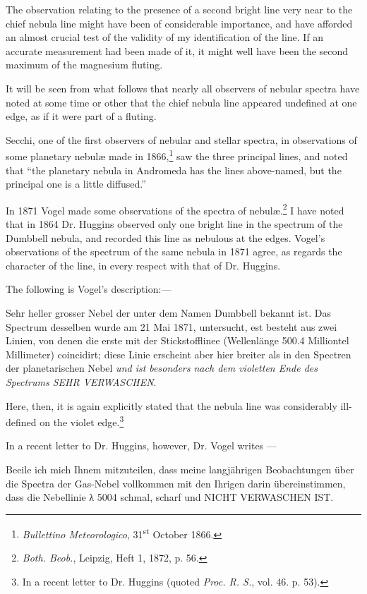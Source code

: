 \documentclass[a4paper, 12pt, oneside, polutonikogreek, english]{article}
\begin{document}
The observation relating to the presence of a second bright line very near to the chief nebula line might have been of considerable importance, and have afforded an almost crucial test of the validity of my identification of the line. If an accurate measurement had been made of it, it might well have been the second maximum of the magnesium fluting.

It will be seen from what follows that nearly all observers of nebular spectra have noted at some time or other that the chief nebula line appeared undefined at one edge, as if it were part of a fluting.

Secchi, one of the first observers of nebular and stellar spectra, in observations of some planetary nebulæ made in 1866,\footnote{\emph{Bullettino Meteorologico}, 31\textsuperscript{st} October 1866.} saw the three principal lines, and noted that ``the planetary nebula in Andromeda has the lines above-named, but the principal one is a little diffused.''

In 1871 Vogel made some observations of the spectra of nebulæ.\footnote{\emph{Both. Beob.}, Leipzig, Heft 1, 1872, p. 56.} I have noted that in 1864 Dr. Huggins observed only one bright line in the spectrum of the Dumbbell nebula, and recorded this line as nebulous at the edges. Vogel's observations of the spectrum of the same nebula in 1871 agree, as regards the character of the line, in every respect with that of Dr. Huggins.

The following is Vogel's description:---

Sehr heller grosser Nebel der unter dem Namen Dumbbell bekannt ist. Das Spectrum desselben wurde am 21 Mai 1871, untersucht, est besteht aus zwei Linien, von denen die erste mit der Stickstofflinee (Wellenlänge 500.4 Milliontel Millimeter) coincidirt; diese Linie erscheint aber hier breiter als in den Spectren der planetarischen Nebel \emph{und ist besonders nach dem violetten Ende des Spectrums SEHR VERWASCHEN}.

Here, then, it is again explicitly stated that the nebula line was considerably ill-defined on the violet edge.\footnote{In a recent letter to Dr. Huggins (quoted \emph{Proc. R. S.}, vol. 46. p. 53).}

In a recent letter to Dr. Huggins, however, Dr. Vogel writes ---

Beeile ich mich Ihnem mitzuteilen, dass meine langjährigen Beobachtungen über die Spectra der Gas-Nebel vollkommen mit den Ihrigen darin übereinstimmen, dass die Nebellinie λ 5004 schmal, scharf und NICHT VERWASCHEN IST.
\end{document}
